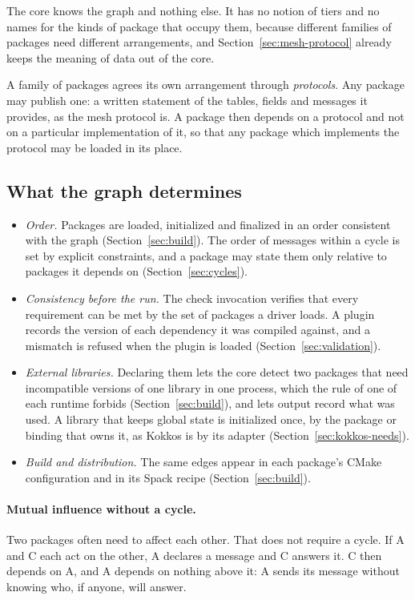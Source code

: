 \documentclass[11pt,a4paper]{article}
\begin{document}
The core knows the graph and nothing else.  It has no notion of tiers and no
names for the kinds of package that occupy them, because different families
of packages need different arrangements, and Section~\ref{sec:mesh-protocol}
already keeps the meaning of data out of the core.

A family of packages agrees its own arrangement through \emph{protocols}.
Any package may publish one: a written statement of the tables, fields and
messages it provides, as the mesh protocol is.  A package then depends on a
protocol and not on a particular implementation of it, so that any package
which implements the protocol may be loaded in its place.

\subsection{What the graph determines}

\begin{itemize}
  \item \emph{Order.}  Packages are loaded, initialized and finalized in an
        order consistent with the graph (Section~\ref{sec:build}).  The order
        of messages within a cycle is set by explicit constraints, and a
        package may state them only relative to packages it depends on
        (Section~\ref{sec:cycles}).
  \item \emph{Consistency before the run.}  The check invocation verifies
        that every requirement can be met by the set of packages a driver
        loads.  A plugin records the version of each dependency it was
        compiled against, and a mismatch is refused when the plugin is
        loaded (Section~\ref{sec:validation}).
  \item \emph{External libraries.}  Declaring them lets the core detect two
        packages that need incompatible versions of one library in one
        process, which the rule of one of each runtime forbids
        (Section~\ref{sec:build}), and lets output record what was used.  A
        library that keeps global state is initialized once, by the package
        or binding that owns it, as Kokkos is by its adapter
        (Section~\ref{sec:kokkos-needs}).
  \item \emph{Build and distribution.}  The same edges appear in each
        package's CMake configuration and in its Spack recipe
        (Section~\ref{sec:build}).
\end{itemize}

\paragraph{Mutual influence without a cycle.}  Two packages often need to
affect each other.  That does not require a cycle.  If A and C each act on
the other, A declares a message and C answers it.  C then depends on A, and
A depends on nothing above it: A sends its message without knowing who, if
anyone, will answer.
\end{document}

